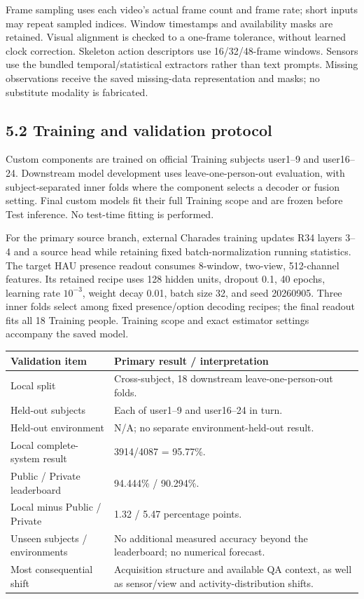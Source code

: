 \documentclass[12pt,a4paper]{article}
\begin{document}
Frame sampling uses each video's actual frame count and frame rate; short inputs may repeat sampled indices. Window timestamps and availability masks are retained. Visual alignment is checked to a one-frame tolerance, without learned clock correction. Skeleton action descriptors use 16/32/48-frame windows. Sensors use the bundled temporal/statistical extractors rather than text prompts. Missing observations receive the saved missing-data representation and masks; no substitute modality is fabricated.

\subsection*{5.2 Training and validation protocol}
Custom components are trained on official Training subjects user1--9 and user16--24. Downstream model development uses leave-one-person-out evaluation, with subject-separated inner folds where the component selects a decoder or fusion setting. Final custom models fit their full Training scope and are frozen before Test inference. No test-time fitting is performed.

For the primary source branch, external Charades training updates R34 layers 3--4 and a source head while retaining fixed batch-normalization running statistics. The target HAU presence readout consumes 8-window, two-view, 512-channel features. Its retained recipe uses 128 hidden units, dropout 0.1, 40 epochs, learning rate $10^{-3}$, weight decay 0.01, batch size 32, and seed 20260905. Three inner folds select among fixed presence/option decoding recipes; the final readout fits all 18 Training people. Training scope and exact estimator settings accompany the saved model.

\begin{tabularx}{\linewidth}{@{}L{60mm}Y@{}}
\toprule
Validation item & Primary result / interpretation\\
\midrule
Local split & Cross-subject, 18 downstream leave-one-person-out folds.\\
Held-out subjects & Each of user1--9 and user16--24 in turn.\\
Held-out environment & N/A; no separate environment-held-out result.\\
Local complete-system result & 3914/4087 = 95.77\%.\\
Public / Private leaderboard & 94.444\% / 90.294\%.\\
Local minus Public / Private & 1.32 / 5.47 percentage points.\\
Unseen subjects / environments & No additional measured accuracy beyond the leaderboard; no numerical forecast.\\
Most consequential shift & Acquisition structure and available QA context, as well as sensor/view and activity-distribution shifts.\\
\bottomrule
\end{tabularx}
\end{document}
